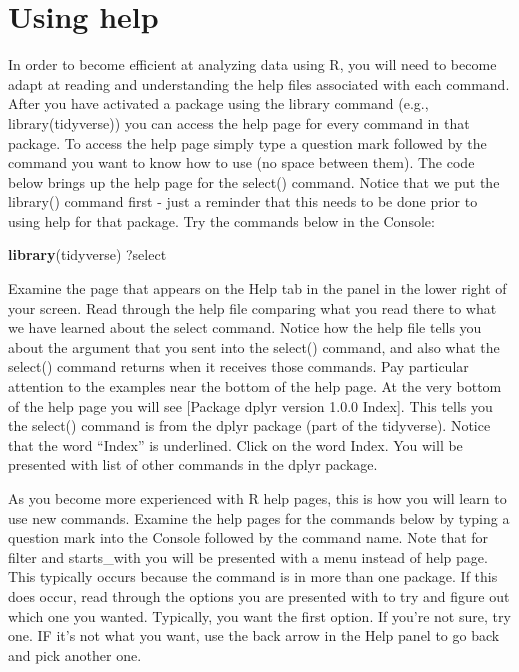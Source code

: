 \documentclass[
]{krantz}
\makeatletter
\newenvironment{Shaded}{\begin{snugshade}}{\end{snugshade}}
\newcommand{\KeywordTok}[1]{\textcolor[rgb]{0.27,0.27,0.27}{\textbf{#1}}}
\newcommand{\NormalTok}[1]{#1}
\newenvironment{kframe}{%
\medskip{}
\setlength{\fboxsep}{.8em}
 \def\at@end@of@kframe{}%
 \ifinner\ifhmode%
  \def\at@end@of@kframe{\end{minipage}}%
  \begin{minipage}{\columnwidth}%
 \fi\fi%
 \def\FrameCommand##1{\hskip\@totalleftmargin \hskip-\fboxsep
 \colorbox{shadecolor}{##1}\hskip-\fboxsep
     \hskip-\linewidth \hskip-\@totalleftmargin \hskip\columnwidth}%
 \MakeFramed {\advance\hsize-\width
   \@totalleftmargin\z@ \linewidth\hsize
   \@setminipage}}%
 {\par\unskip\endMakeFramed%
 \at@end@of@kframe}
\renewenvironment{Shaded}{\begin{kframe}}{\end{kframe}}
\makeatother
\begin{document}
\hypertarget{using-help}{%
\section{Using help}\label{using-help}}

In order to become efficient at analyzing data using R, you will need to become adapt at reading and understanding the help files associated with each command. After you have activated a package using the library command (e.g., library(tidyverse)) you can access the help page for every command in that package. To access the help page simply type a question mark followed by the command you want to know how to use (no space between them). The code below brings up the help page for the select() command. Notice that we put the library() command first - just a reminder that this needs to be done prior to using help for that package. Try the commands below in the Console:

\begin{Shaded}
\begin{Highlighting}[]
\KeywordTok{library}\NormalTok{(tidyverse)}
\NormalTok{?select}
\end{Highlighting}
\end{Shaded}

Examine the page that appears on the Help tab in the panel in the lower right of your screen. Read through the help file comparing what you read there to what we have learned about the select command. Notice how the help file tells you about the argument that you sent into the select() command, and also what the select() command returns when it receives those commands. Pay particular attention to the examples near the bottom of the help page. At the very bottom of the help page you will see {[}Package dplyr version 1.0.0 Index{]}. This tells you the select() command is from the dplyr package (part of the tidyverse). Notice that the word ``Index'' is underlined. Click on the word Index. You will be presented with list of other commands in the dplyr package.

As you become more experienced with R help pages, this is how you will learn to use new commands. Examine the help pages for the commands below by typing a question mark into the Console followed by the command name. Note that for filter and starts\_with you will be presented with a menu instead of help page. This typically occurs because the command is in more than one package. If this does occur, read through the options you are presented with to try and figure out which one you wanted. Typically, you want the first option. If you're not sure, try one. IF it's not what you want, use the back arrow in the Help panel to go back and pick another one.
\end{document}
